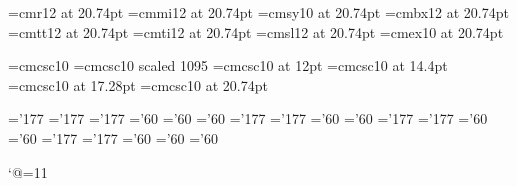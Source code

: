 \font\twnrm=cmr12 at 20.74pt
\font\twni=cmmi12 at 20.74pt
\font\twnsy=cmsy10 at 20.74pt
\font\twnbf=cmbx12 at 20.74pt
\font\twntt=cmtt12 at 20.74pt
\font\twnit=cmti12 at 20.74pt
\font\twnsl=cmsl12 at 20.74pt
\font\twnex=cmex10 at 20.74pt

\font\tensc=cmcsc10
\font\elvsc=cmcsc10 scaled 1095
\font\twlsc=cmcsc10 at 12pt
\font\ftnsc=cmcsc10 at 14.4pt
\font\stnsc=cmcsc10 at 17.28pt
\font\twnsc=cmcsc10 at 20.74pt

\skewchar\ninei='177    \skewchar\eighti='177  \skewchar\sixi='177
\skewchar\ninesy='60    \skewchar\eightsy='60  \skewchar\sixsy='60
\skewchar\twli='177     \skewchar\elvi='177
\skewchar\twlsy='60     \skewchar\elvsy='60
\skewchar\sevenhi='177  \skewchar\fivehi='177
\skewchar\sevenhsy='60  \skewchar\fivehsy='60
\hyphenchar{}  \hyphenchar{}
\hyphenchar{} \hyphenchar{} \hyphenchar{}
\skewchar\ftni='177     \skewchar\stni='177
\skewchar\ftnsy='60     \skewchar\stnsy='60
\skewchar\twnsy='60
\hyphenchar{}  \hyphenchar{}
\hyphenchar{}


\catcode`@=11 %
\newskip\ttglue

\def\eightpoint{\def\rm{\fam0\eightrm}%
  \textfont0=\eightrm \scriptfont0=\sixrm \scriptscriptfont0=\fiverm
  \textfont1=\eighti \scriptfont1=\sixi \scriptscriptfont1=\fivei
  \textfont2=\eightsy \scriptfont2=\sixsy \scriptscriptfont2=\fivesy
  \textfont3=\tenex \scriptfont3=\tenex \scriptscriptfont3=\tenex
  \textfont\itfam=\eightit  \def\it{\fam\itfam\eightit}%
  \textfont\slfam=\eightsl  \def\sl{\fam\slfam\eightsl}%
  \textfont\ttfam=\eighttt  \def\tt{\fam\ttfam\eighttt}%
  \textfont\bffam=\eightbf  \scriptfont\bffam=\sixbf
   \scriptscriptfont\bffam=\fivebf  \def\bf{\fam\bffam\eightbf}%
  \def\oldstyle{\fam1\eighti}%
  \tt \ttglue=.5em plus.25em minus.15em
  \setbox\strutbox=\hbox{\vrule height7pt depth2pt width\z@}%
  \def\big##1{{\hbox{$\left##1\vbox to6.5\p@{}\right.\n@space$}}}%
  \def\Big##1{{\hbox{$\left##1\vbox to9\p@{}\right.\n@space$}}}%
  \def\bigg##1{{\hbox{$\left##1\vbox to11.5\p@{}\right.\n@space$}}}%
  \def\Bigg##1{{\hbox{$\left##1\vbox to14\p@{}\right.\n@space$}}}%
  \normalbaselineskip=9pt
  \normalbaselines\rm}

